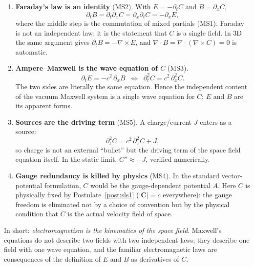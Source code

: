 \documentclass[aps,prd,preprint,superscriptaddress,amsmath,amssymb]{revtex4-2}
\begin{document}
\begin{enumerate}
  \item \textbf{Faraday's law is an identity} (MS2).  With
  $E=-\partial_t C$ and $B=\partial_x C$,
  \begin{equation}
  \partial_t B = \partial_t\partial_x C = \partial_x\partial_t C = -\partial_x E ,
  \end{equation}
  where the middle step is the commutation of mixed partials (MS1).  Faraday
  is not an independent law; it is the statement that $C$ is a single field.
  In 3D the same argument gives $\partial_t B = -\nabla\times E$, and
  $\nabla\cdot B = \nabla\cdot(\nabla\times C)=0$ is automatic.

  \item \textbf{Ampere--Maxwell is the wave equation of $C$} (MS3).
  \begin{equation}
  \partial_t E = -c^2\,\partial_x B
  \;\;\Longleftrightarrow\;\;
  \partial_t^2 C = c^2\,\partial_x^2 C .
  \end{equation}
  The two sides are literally the same equation.  Hence the independent
  content of the vacuum Maxwell system is a single wave equation for $C$;
  $E$ and $B$ are its apparent forms.

  \item \textbf{Sources are the driving term} (MS5).  A charge/current
  $J$ enters as a source:
  \begin{equation}
  \partial_t^2 C = c^2\,\partial_x^2 C + J ,
  \end{equation}
  so charge is not an external ``bullet'' but the driving term of the space
  field equation itself.  In the static limit, $C''\approx -J$, verified
  numerically.

  \item \textbf{Gauge redundancy is killed by physics} (MS4).  In the
  standard vector-potential formulation, $C$ would be the gauge-dependent
  potential $A$.  Here $C$ is physically fixed by
  Postulate~\ref{post:sls1} ($|\bm{C}|=c$ everywhere): the gauge freedom is
  eliminated not by a choice of convention but by the physical condition
  that $C$ is the actual velocity field of space.
\end{enumerate}

In short: \emph{electromagnetism is the kinematics of the space field}.
Maxwell's equations do not describe two fields with two independent laws;
they describe one field with one wave equation, and the familiar
electromagnetic laws are consequences of the definition of $E$ and $B$ as
derivatives of $C$.
\end{document}
